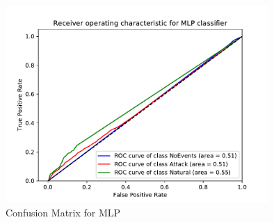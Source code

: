 \begin{figure}[H]
    \centering
    \includegraphics[page=2, width=100mm, trim= 0 50 0 100, clip]{images/results_scikit/MLP}
    \caption{Confusion Matrix for MLP}
    \label{fig_scikit_MLP_ROC}
\end{figure}



